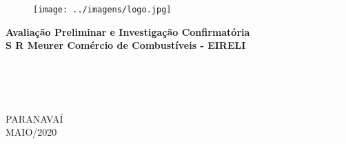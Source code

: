 \thispagestyle{empty}
\fancyhead[LE,RO]{}
\begin{figure}[t]
\centering
\texttt{[image: ../imagens/logo.jpg]}
\end{figure}
\mbox{}
 
\vspace{6.5cm}

\begin{center}
{\Large \bfseries
Avaliação Preliminar e Investigação Confirmatória\\ 
S R Meurer Comércio de Combustíveis - EIRELI}
\end{center}
\mbox{}

\vfill

\begin{flushright}
\begin{minipage}[h]{8cm}
{\footnotesize \textcolor{white} {Avaliação Preliminar e Investigação Confirmatória elaborado segundo diretrizes da Resolução SEDEST 3/2020 - Anexo VI pela T \& C Serviços Geoambientais LTDA e protocolado no IAP - ERPVI.}}
\end{minipage}
\end{flushright}

\vfill

\begin{center}
{\large
{PARANAVAÍ\\
MAIO/2020}
}
\end{center}
\newpage
\insertblankpage



